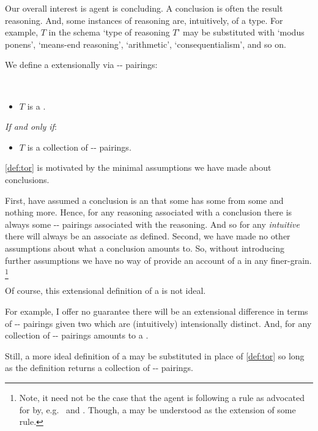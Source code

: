 \begin{note}
  Our overall interest is agent is concluding.
  A conclusion is often the result reasoning.
  And, some instances of reasoning are, intuitively, of a type.
  For example, \(T\) in the schema `type of reasoning \(T\)' may be substituted with `modus ponens', `means-end reasoning', `arithmetic', `consequentialism', and so on.

  We define a  extensionally via -- pairings:

  \begin{definition}[A \torN{0}]
    \label{def:tor}
    \mbox{ }
    \vspace{-\baselineskip}
    \begin{itemize}
    \item
      \(T\) is a \torN{}.
    \end{itemize}

    \emph{If and only if}:

    \begin{itemize}
    \item
      \(T\) is a collection of -- pairings.
    \end{itemize}
    \vspace{-\baselineskip}
  \end{definition}

  \noindent%
  \autoref{def:tor} is motivated by the minimal assumptions we have made about conclusions.

  First, have assumed a conclusion is an \eval{} that some  has some  from some  and nothing more.
  Hence, for any reasoning associated with a conclusion there is always some -- pairings associated with the reasoning.
  And so for any \emph{intuitive} \torN{} there will always be an associate \torN{} as defined.
  Second, we have made no other assumptions about what a conclusion amounts to.
  So, without introducing further assumptions we have no way of provide an account of a  in any finer-grain.%
  \footnote{
    Note, it need not be the case that the agent is following a rule as advocated for by, e.g.\ \textcite{Boghossian:2008vf,Boghossian:2012vb} and \textcite{Broome:2002aa,Broome:2013aa}.
    Though, a \torNa{} may be understood as the extension of some rule.
  }
\end{note}


\begin{note}
  Of course, this extensional definition of a  is not ideal.

  For example, I offer no guarantee there will be an extensional difference in terms of -- pairings given two  which are (intuitively) intensionally distinct.
  And, for any collection of -- pairings amounts to a .

  Still, a more ideal definition of a  may be substituted in place of \autoref{def:tor} so long as the definition returns a collection of -- pairings.
\end{note}


